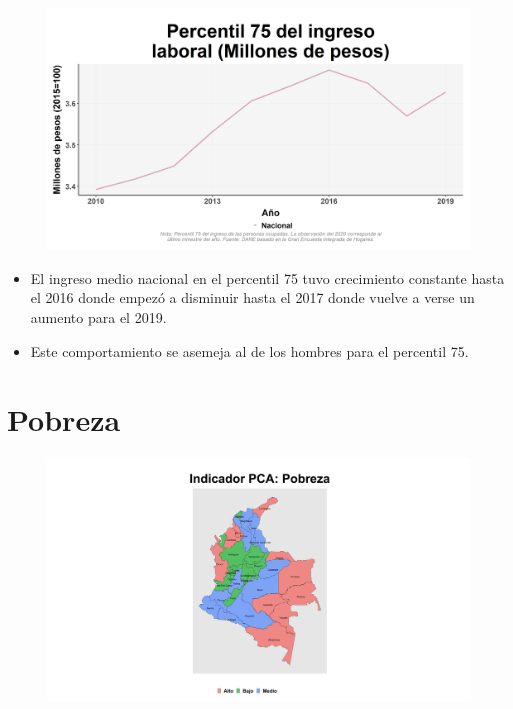     \begin{figure}[H]
        \caption[Percentil 75 del ingreso laboral nacional ]{\label{ingreso_laboral_75_nacional} }
        \begin{center}
        \includegraphics[width=\textwidth,keepaspectratio]{img/var_27_trend.png}
        \end{center}
    \end{figure}
            \begin{itemize}
                    \item El ingreso medio nacional en el percentil 75 tuvo crecimiento constante hasta el 2016 donde empezó a disminuir hasta el 2017 donde vuelve a verse un aumento para el 2019.
                    \item Este comportamiento se asemeja al de los hombres para el percentil 75.
                \end{itemize}

\section{Pobreza}

    \begin{figure}[H]
        \caption[Indicador Pulso Social sobre Pobreza (PCA)]{\label{pca_pobreza} }
        \begin{center}
        \includegraphics[width=\textwidth,keepaspectratio]{pca_clusters/pca_pobreza_pca.png}
        \end{center}
    \end{figure}

